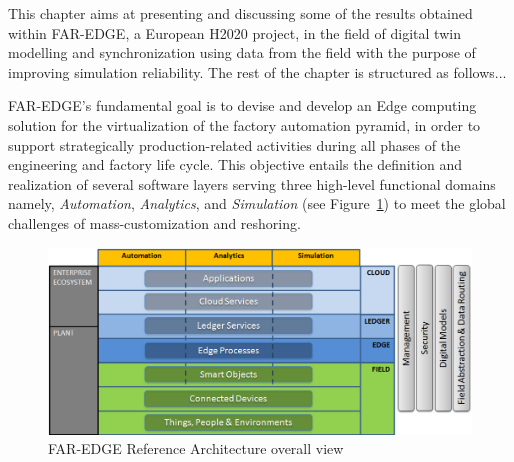 This chapter aims at presenting and discussing some of the results obtained within FAR-EDGE, a European H2020 project, in the field of digital twin modelling and synchronization using data from the field with the purpose of improving simulation reliability. 
The rest of the chapter is structured as follows...




FAR-EDGE’s fundamental goal is to devise and develop an Edge computing solution for the virtualization of the factory automation pyramid, in order to support strategically production-related activities during all phases of the engineering and factory life cycle. This objective entails the definition and realization of several software layers serving three high-level functional domains namely, \textit{Automation}, \textit{Analytics}, and \textit{Simulation} (see Figure~\ref{fig:architecture}) to meet the global challenges of mass-customization and reshoring.

\begin{figure}
	\centering
	\includegraphics[width=\linewidth]{images/Far-edge.png}
	\caption{FAR-EDGE Reference Architecture overall view}
	\label{fig:architecture}
\end{figure}

